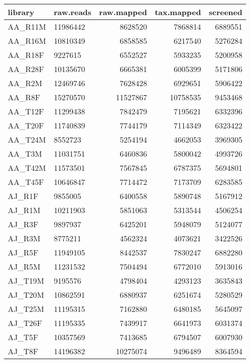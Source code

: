 \begin{table}[h]
\begin{center}
\begin{tabular}{llrrr}
  \hline
library & raw.reads & raw.mapped & tax.mapped & screened \\ 
  \hline
AA\_R11M & 11986442 & 8628520 & 7868814 & 6889551 \\ 
  AA\_R16M & 10810349 & 6858585 & 6217540 & 5276284 \\ 
  AA\_R18F & 9227615 & 6552527 & 5933235 & 5200958 \\ 
  AA\_R28F & 10135670 & 6665381 & 6005399 & 5171806 \\ 
  AA\_R2M & 12469746 & 7628428 & 6929651 & 5906422 \\ 
  AA\_R8F & 15270570 & 11527867 & 10758535 & 9453468 \\ 
  AA\_T12F & 11299438 & 7842479 & 7195621 & 6332396 \\ 
  AA\_T20F & 11740839 & 7744179 & 7114349 & 6323422 \\ 
  AA\_T24M & 8552723 & 5254194 & 4662053 & 3969305 \\ 
  AA\_T3M & 11031751 & 6460836 & 5800042 & 4993726 \\ 
  AA\_T42M & 11573501 & 7567845 & 6787375 & 5694801 \\ 
  AA\_T45F & 10646847 & 7714472 & 7173709 & 6283585 \\ 
  AJ\_R1F & 9855005 & 6400558 & 5890748 & 5167912 \\ 
  AJ\_R1M & 10211903 & 5851063 & 5313544 & 4506254 \\ 
  AJ\_R3F & 9897937 & 6425201 & 5948079 & 5124077 \\ 
  AJ\_R3M & 8775211 & 4562324 & 4073621 & 3422526 \\ 
  AJ\_R5F & 11949105 & 8442537 & 7830247 & 6882280 \\ 
  AJ\_R5M & 11231532 & 7504494 & 6772010 & 5913016 \\ 
  AJ\_T19M & 9195576 & 4798404 & 4293123 & 3635843 \\ 
  AJ\_T20M & 10862591 & 6880937 & 6251674 & 5280529 \\ 
  AJ\_T25M & 11195315 & 7162880 & 6480185 & 5645097 \\ 
  AJ\_T26F & 11195335 & 7439917 & 6641973 & 6031374 \\ 
  AJ\_T5F & 10357569 & 7413685 & 6794507 & 6007930 \\ 
  AJ\_T8F & 14196382 & 10275074 & 9496489 & 8364594 \\ 

\end{tabular}
\end{center}
\end{table}
